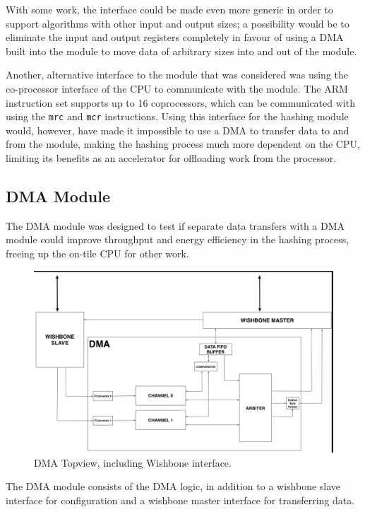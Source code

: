 With some work, the interface could be made even more generic in order to support algorithms
with other input and output sizes; a possibility would be to eliminate the input and output
registers completely in favour of using a DMA built into the module to move data of arbitrary
sizes into and out of the module.

Another, alternative interface to the module that was considered was using the co-processor interface
of the CPU to communicate with the module. The ARM instruction set supports up to 16 coprocessors,
which can be communicated with using the \texttt{mrc} and \texttt{mcr} instructions. Using this
interface for the hashing module would, however, have made it impossible to use a DMA to transfer
data to and from the module, making the hashing process much more dependent on the CPU, limiting
its benefits as an accelerator for offloading work from the processor.

\subsection{DMA Module}

The DMA module was designed to test if separate data transfers with a DMA module could improve throughput and energy efficiency in the hashing process, freeing up the on-tile CPU for other work.

\begin{figure}[htb]
    \centering
    \includegraphics[width=1.0\textwidth]{Figures/DMA/DMATopview}
    \caption{DMA Topview, including Wishbone interface.}
    \label{fig:DMATop}
\end{figure}

The DMA module consists of the DMA logic, in addition to a wishbone slave interface for configuration
and a wishbone master interface for transferring data.

